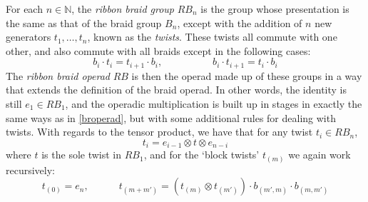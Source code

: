 \documentclass{amsbook} %
\numberwithin{section}{chapter}
\begin{document}
\begin{Defi} For each $n \in \mathbb{N}$, the \emph{ribbon braid group} $RB_{n}$ is the group whose presentation is the same as that of the braid group $B_{n}$, except with the addition of $n$ new generators $t_1, \ldots, t_n$, known as the \emph{twists}. These twists all commute with one other, and also commute with all braids except in the following cases:
\[ b_i \cdot t_i = t_{i+1} \cdot b_i, \quad \quad \quad \quad \quad b_i \cdot t_{i+1} = t_i \cdot b_i \]
The \emph{ribbon braid operad} $RB$ is then the operad made up of these groups in a way that extends the definition of the braid operad. In other words, the identity is still $e_1 \in RB_1$, and the operadic multiplication is built up in stages in exactly the same ways as in \cref{broperad}, but with some additional rules for dealing with twists. With regards to the tensor product, we have that for any twist $t_i \in RB_{n}$,
\[ t_i = e_{i-1} \otimes t \otimes e_{n-i} \]
where $t$ is the sole twist in $RB_1$, and for the `block twists' $t_{(m)}$ we again work recursively:
\[ t_{(0)} = e_n, \quad \quad \quad t_{(m+m')} = (t_{(m)} \otimes t_{(m')}) \cdot b_{(m', m)} \cdot b_{(m, m')} \]
\end{Defi}
\end{document}
